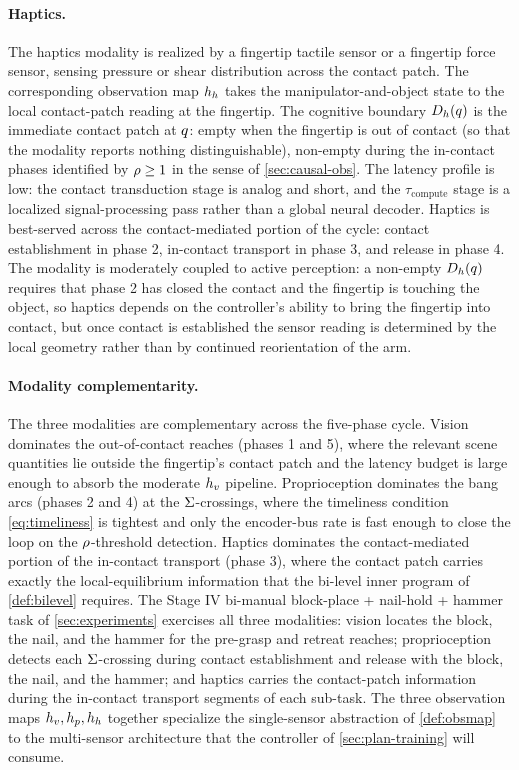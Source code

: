 \paragraph{Haptics.}
The haptics modality is realized by a fingertip tactile sensor or
a fingertip force sensor, sensing pressure or shear distribution
across the contact patch. The corresponding observation map
$h_{h}$ takes the manipulator-and-object state to the local
contact-patch reading at the fingertip. The cognitive boundary
$D_{h}(q)$ is the immediate contact patch at
$q$: empty when the fingertip is out of contact (so that
the modality reports nothing distinguishable), non-empty during
the in-contact phases identified by $\rho \ge 1$ in the
sense of \cref{sec:causal-obs}. The latency profile is low: the
contact transduction stage is analog and short, and the
$\tau_{\mathrm{compute}}$ stage is a localized signal-processing
pass rather than a global neural decoder. Haptics is best-served
across the contact-mediated portion of the cycle: contact
establishment in phase 2, in-contact transport in phase 3, and
release in phase 4. The modality is moderately coupled to active
perception: a non-empty $D_{h}(q)$ requires that phase 2
has closed the contact and the fingertip is touching the object,
so haptics depends on the controller's ability to bring the
fingertip into contact, but once contact is established the
sensor reading is determined by the local geometry rather than by
continued reorientation of the arm.

\paragraph{Modality complementarity.}
The three modalities are complementary across the five-phase
cycle. Vision dominates the out-of-contact reaches (phases 1 and
5), where the relevant scene quantities lie outside the
fingertip's contact patch and the latency budget is large enough
to absorb the moderate $h_{v}$ pipeline. Proprioception
dominates the bang arcs (phases 2 and 4) at the
$\Sigma$-crossings, where the timeliness condition
\eqref{eq:timeliness} is tightest and only the encoder-bus rate
is fast enough to close the loop on the $\rho$-threshold
detection. Haptics dominates the contact-mediated portion of the
in-contact transport (phase 3), where the contact patch carries
exactly the local-equilibrium information that the bi-level
inner program of \cref{def:bilevel} requires. The Stage IV
bi-manual block-place + nail-hold + hammer task of
\cref{sec:experiments} exercises all three modalities: vision
locates the block, the nail, and the hammer for the pre-grasp and
retreat reaches; proprioception detects each $\Sigma$-crossing
during contact establishment and release with the block, the
nail, and the hammer; and haptics carries the contact-patch
information during the in-contact transport segments of each
sub-task. The three observation maps
$h_{v}, h_{p}, h_{h}$ together specialize the
single-sensor abstraction of \cref{def:obsmap} to the
multi-sensor architecture that the controller of
\cref{sec:plan-training} will consume.

